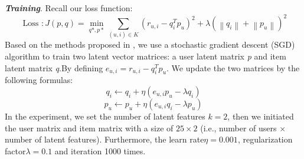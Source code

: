 \textbf{\textit{Training}}.
Recall our loss function:
\begin{equation}
        \text { Loss }: J(p, q)=\min_{ q *, p * } \sum_{(u, i) \in K}\left(r_{u,i}-q_{i}^{T} p_{u}\right)^{2}+\lambda\left(\left\|q_{i}\right\|+\left\|p_{u}\right\|\right)^{2}
\end{equation}
Based on the methods proposed in \cite{mf1}, we use a stochastic gradient descent (SGD) algorithm to train two latent vector matrices: a user latent matrix \textit{p} and item latent matrix \textit{q}.By defining $e_{u,i}=r_{u,i}-q_{i}^{T} p_{u}$. We update the two matrices by the following formulas:
\begin{equation}
    q_{i} \leftarrow q_{i}+\eta\left(e_{u,i} p_{u}-\lambda q_{i}\right)
\end{equation}
\begin{equation}
    p_{u} \leftarrow p_{u}+\eta\left(e_{u,i} q_{i}-\lambda p_{u}\right)
\end{equation}
In the experiment, we set the number of latent features $k=2$, then we initiated the user matrix and item matrix with a size of $25 \times 2$ (i.e., number of users $\times$ number of latent features).
Furthermore, the learn rate$\eta=0.001$, regularization factor$\lambda = 0.1$ and iteration 1000 times.
